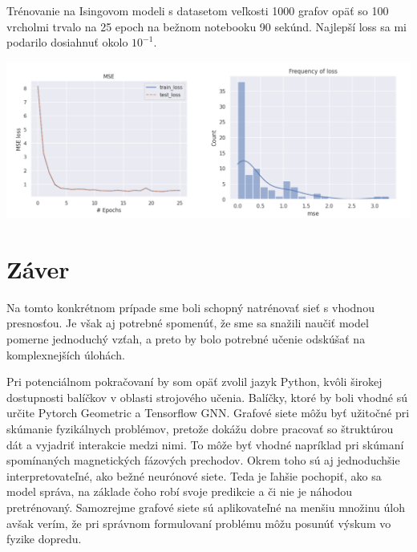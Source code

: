 \documentclass{article}
\begin{document}
Trénovanie na Isingovom modeli s datasetom veľkosti 1000 grafov opäť so 100 vrcholmi trvalo na 25 epoch na bežnom notebooku 90 sekúnd. Najlepší loss sa mi podarilo dosiahnuť okolo $10^{-1}$.

\begin{center}
    \includegraphics*[scale=0.28]{heisenberg_path.png}
\end{center}


\section*{Záver}
Na tomto konkrétnom prípade sme boli schopný natrénovať sieť s vhodnou presnosťou. Je však aj potrebné spomenúť, že sme sa snažili naučiť model pomerne jednoduchý vzťah, a preto by bolo potrebné učenie odskúšať na komplexnejších úlohách.

\newblock

Pri potenciálnom pokračovaní by som opäť zvolil jazyk Python, kvôli širokej dostupnosti balíčkov v oblasti strojového učenia. Balíčky, ktoré by boli vhodné sú určite Pytorch Geometric a Tensorflow GNN. Grafové siete môžu byť užitočné pri skúmanie fyzikálnych problémov, pretože dokážu dobre pracovať so štruktúrou dát a vyjadriť interakcie medzi nimi. To môže byť vhodné napríklad pri skúmaní spomínaných magnetických fázových prechodov. Okrem toho sú aj jednoduchšie interpretovateľné, ako bežné neurónové siete. Teda je ľahšie pochopiť, ako sa model správa, na základe čoho robí svoje predikcie a či nie je náhodou pretrénovaný. Samozrejme grafové siete sú aplikovateľné na menšiu množinu úloh avšak verím, že pri správnom formulovaní problému môžu posunúť výskum vo fyzike dopredu.



\end{document}
